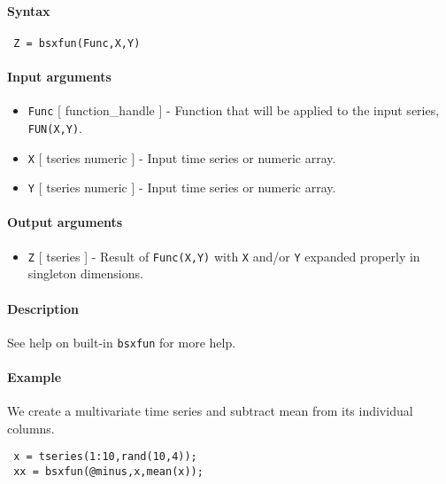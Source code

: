 


	\paragraph{Syntax}
 
 \begin{verbatim}
 Z = bsxfun(Func,X,Y)
 \end{verbatim}
 
 \paragraph{Input arguments}
 
 \begin{itemize}
 \item
   \texttt{Func} {[} function\_handle {]} - Function that will be applied
   to the input series, \texttt{FUN(X,Y)}.
 \item
   \texttt{X} {[} tseries \textbar{} numeric {]} - Input time series or
   numeric array.
 \item
   \texttt{Y} {[} tseries \textbar{} numeric {]} - Input time series or
   numeric array.
 \end{itemize}
 
 \paragraph{Output arguments}
 
 \begin{itemize}
 \item
   \texttt{Z} {[} tseries {]} - Result of \texttt{Func(X,Y)} with
   \texttt{X} and/or \texttt{Y} expanded properly in singleton
   dimensions.
 \end{itemize}
 
 \paragraph{Description}
 
 See help on built-in \texttt{bsxfun} for more help.
 
 \paragraph{Example}
 
 We create a multivariate time series and subtract mean from its
 individual columns.
 
 \begin{verbatim}
 x = tseries(1:10,rand(10,4));
 xx = bsxfun(@minus,x,mean(x));
 \end{verbatim}


